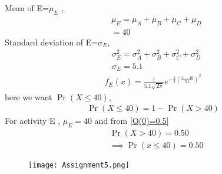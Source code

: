 \documentclass[journal,12pt,twocolumn]{IEEEtran}
\begin{document}
Mean of E=$\mu_E$ ,
\begin{align}
&\mu_E=\mu_A+\mu_B+\mu_C+\mu_D\\
&=40
\end{align}
Standard deviation of E=$\sigma_E$,
\begin{align}
&\sigma_E^2=\sigma_A^2+\sigma_B^2+\sigma_C^2+\sigma_D^2\\
&\sigma_E=5.1
\end{align}
\begin{align}
f_E(x)=\frac{1}{5.1\sqrt{2\pi}}e^{-\frac{1}{2}\left(\frac{x-40}{5.1}\right)^2}
\end{align}
here we want $\Pr(X\leq40)$,
\begin{align}
\Pr(X\leq40)=1-\Pr(X>40)    
\end{align}
For activity E , $\mu_E=40$ and from \eqref{Q(0)=0.5}
\begin{align}
&\Pr(X>40)=0.50\\
&\implies\Pr(x\leq40)=0.50
\end{align}
\begin{figure}[h]
    \centering
    \texttt{[image: Assignment5.png]}
    \label{fig:my_label}
\end{figure}
\end{document}
